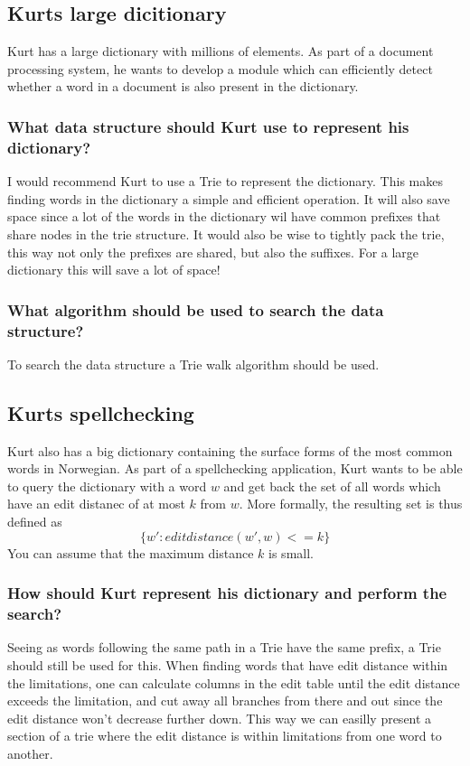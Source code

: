 \documentclass{article}
\begin{document}
\subsection{Kurts large dicitionary}
Kurt has a large dictionary with millions of elements. As part of a document processing system, he wants to develop a module which can efficiently detect whether a word in a document is also present in the dictionary.
\subsubsection{What data structure should Kurt use to represent his dictionary?}
I would recommend Kurt to use a Trie to represent the dictionary. This makes finding words in the dictionary a simple and efficient operation. It will also save space since a lot of the words in the dictionary wil have common prefixes that share nodes in the trie structure. It would also be wise to tightly pack the trie, this way not only the prefixes are shared, but also the suffixes. For a large dictionary this will save a lot of space!
\subsubsection{What algorithm should be used to search the data structure?}
To search the data structure a Trie walk algorithm should be used.

\subsection{Kurts spellchecking}
Kurt also has a big dictionary containing the surface forms of the most common words in Norwegian. As part of a spellchecking application, Kurt wants to be able to query the dictionary with a word $w$ and get back the set of all words which have an edit distanec of at most $k$ from $w$. More formally, the resulting set is thus defined as $$\{w': editdistance(w',w) <= k \}$$ You can assume that the maximum distance $k$ is small.
\subsubsection{How should Kurt represent his dictionary and perform the search?}
Seeing as words following the same path in a Trie have the same prefix, a Trie should still be used for this. When finding words that have edit distance within the limitations, one can calculate columns in the edit table until the edit distance exceeds the limitation, and cut away all branches from there and out since the edit distance won't decrease further down. This way we can easilly present a section of a trie where the edit distance is within limitations from one word to another. 
\end{document}
